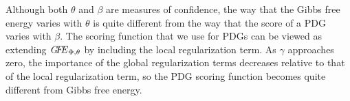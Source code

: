 \documentclass{article}
\begin{document}
	Although both $\theta$ and $\beta$ are measures of confidence, 
	the way that the Gibbs free energy varies with $\theta$ 
	is quite different from the way that the score of a PDG
	varies with $\beta$. 
	The scoring function that we use for PDGs can be viewed as
	extending ${\mathit{G\mkern-4mu F\mkern-4.5mu E}}_{\Phi,\theta}$ by including
	the local regularization term.
	As $\gamma$ approaches zero,
	the importance of the global regularization terms decreases relative
	to that of the local regularization term, so the PDG scoring function
	becomes quite different from Gibbs free energy.
	
\end{document}
